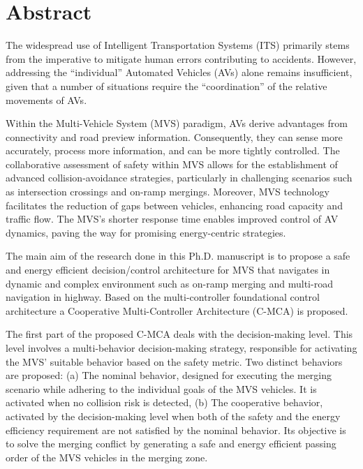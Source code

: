 
\chapter{Abstract}
\thispagestyle{empty}



The widespread use of Intelligent Transportation Systems (ITS) primarily stems from the imperative to mitigate human errors contributing to accidents. However, addressing the ``individual'' Automated Vehicles (AVs) alone remains insufficient, given that a number of situations  require the  ``coordination'' of the relative movements of AVs.





Within the Multi-Vehicle System (MVS) paradigm, AVs derive advantages from connectivity and road preview information. Consequently, they can sense more accurately, process more information, and can be more tightly controlled. The collaborative assessment of safety within MVS allows for the establishment of advanced collision-avoidance strategies, particularly in challenging scenarios such as intersection crossings and on-ramp mergings. Moreover, MVS technology facilitates the reduction of gaps between vehicles, enhancing road capacity and traffic flow. The MVS's shorter response time enables improved control of AV dynamics, paving the way for promising energy-centric strategies.





The main aim of the research done in this Ph.D. manuscript is to propose a safe and energy efficient decision/control architecture for MVS that navigates in dynamic and complex environment such as on-ramp merging and multi-road navigation in highway. Based on the multi-controller foundational control architecture a Cooperative Multi-Controller Architecture (C-MCA) is proposed. 










The first part of the proposed C-MCA deals with the decision-making level. This level involves a multi-behavior decision-making strategy, responsible for activating the MVS' suitable behavior based on the safety metric. Two distinct behaviors are proposed: (a) The nominal behavior, designed for executing the merging scenario while adhering to the individual goals of the MVS vehicles. It is activated when no collision risk is detected, (b) The cooperative behavior, activated by the decision-making level when both of the safety and the energy efficiency requirement are not satisfied by the nominal behavior. Its objective is to solve the merging conflict by generating a safe and energy efficient passing order of the MVS vehicles in the merging zone. 






